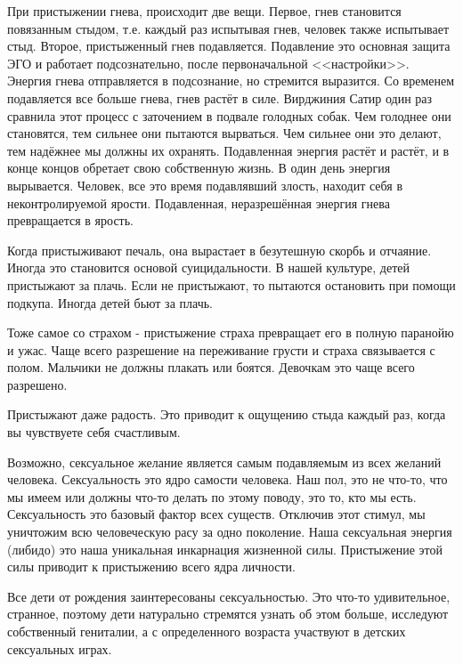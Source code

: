 \documentclass[10pt, fleqn]{article}
\begin{document}

При пристыжении гнева, происходит две вещи. Первое, гнев становится повязанным стыдом, т.е. каждый раз испытывая гнев, человек также испытывает стыд. Второе, пристыженный гнев подавляется. Подавление это основная защита ЭГО и работает подсознательно, после первоначальной <<настройки>>. Энергия гнева отправляется в подсознание, но стремится выразится. Со временем подавляется все больше гнева, гнев растёт в силе.
Вирджиния Сатир один раз сравнила этот процесс с заточением в подвале голодных собак. Чем голоднее они становятся, тем сильнее они пытаются вырваться. Чем сильнее они это делают, тем надёжнее мы должны их охранять. Подавленная энергия растёт и растёт, и в конце концов обретает свою собственную жизнь. В один день энергия вырывается. Человек, все это время подавлявший злость, находит себя в неконтролируемой ярости.
Подавленная, неразрешённая энергия гнева превращается в ярость.

Когда пристыживают печаль, она вырастает в безутешную скорбь и отчаяние. Иногда это становится основой суицидальности. В нашей культуре, детей пристыжают за плачь. Если не пристыжают, то пытаются остановить при помощи подкупа. Иногда детей бьют за плачь.

Тоже самое со страхом - пристыжение страха превращает его в полную паранойю и ужас. Чаще всего разрешение на переживание грусти и страха связывается с полом. Мальчики не должны плакать или боятся. Девочкам это чаще всего разрешено.

Пристыжают даже радость. Это приводит к ощущению стыда каждый раз, когда вы чувствуете себя счастливым.



Возможно, сексуальное желание является самым подавляемым из всех желаний человека. Сексуальность это ядро самости человека. Наш пол, это не что-то, что мы имеем или должны что-то делать по этому поводу, это то, кто мы есть. Сексуальность это базовый фактор всех существ. Отключив этот стимул, мы уничтожим всю человеческую расу за одно поколение. Наша сексуальная энергия (либидо) это наша уникальная инкарнация жизненной силы. Пристыжение этой силы приводит к пристыжению всего ядра личности.

Все дети от рождения заинтересованы сексуальностью. Это что-то удивительное, странное, поэтому дети натурально стремятся узнать об этом больше, исследуют собственный гениталии, а с определенного возраста участвуют в детских сексуальных играх.
\end{document}
